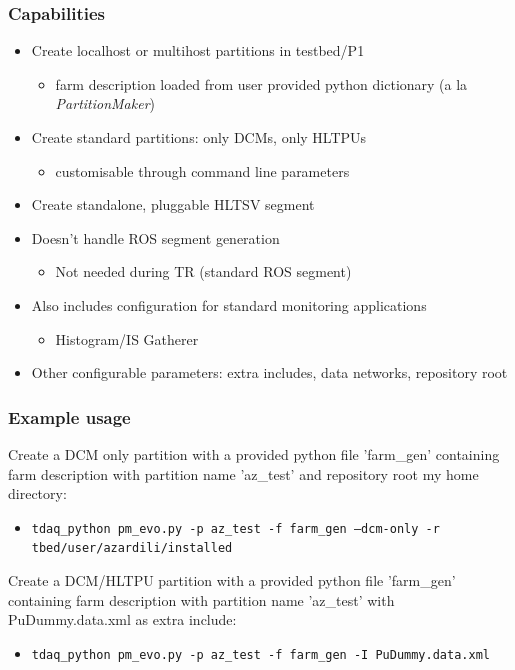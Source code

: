\documentclass{beamer}
\begin{document}
\begin{frame}
 \frametitle{Capabilities}
 \begin{itemize}
   \item Create localhost or multihost partitions in testbed/P1
     \begin{itemize}
       \item farm description loaded from user provided python dictionary (a la \textit{PartitionMaker})
     \end{itemize}
   \item Create standard partitions: only DCMs, only HLTPUs
     \begin{itemize}
       \item customisable through command line parameters
     \end{itemize}

   \item Create standalone, pluggable HLTSV segment
     
   \item Doesn't handle ROS segment generation
     \begin{itemize}
       \item Not needed during TR (standard ROS segment)
     \end{itemize}

   \item Also includes configuration for standard monitoring applications
   \begin{itemize}
     \item Histogram/IS Gatherer
   \end{itemize}
     
   \item Other configurable parameters: extra includes, data networks, repository root

 \end{itemize}
 
\end{frame}


\begin{frame}
  \frametitle{Example usage}
  Create a DCM only partition with a provided python file 'farm\_gen' containing farm
  description with partition name 'az\_test' and repository root my home directory:
  \begin{itemize}
    \item \texttt{tdaq\_python pm\_evo.py -p az\_test -f farm\_gen --dcm-only -r tbed/user/azardili/installed}

  \end{itemize}

    Create a DCM/HLTPU partition with a provided python file 'farm\_gen' containing farm
  description with partition name 'az\_test' with PuDummy.data.xml as extra include:
  \begin{itemize}
    \item \texttt{tdaq\_python pm\_evo.py -p az\_test -f farm\_gen -I PuDummy.data.xml}

  \end{itemize}
\end{frame}
\end{document}
